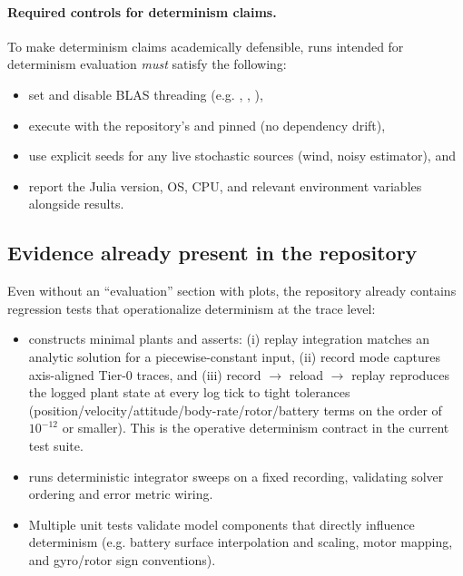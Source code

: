 \paragraph{Required controls for determinism claims.}
To make determinism claims academically defensible, runs intended for determinism evaluation \emph{must} satisfy the following:
\begin{itemize}[leftmargin=*]
  \item set  and disable BLAS threading (e.g. , , ),
  \item execute with the repository's  and  pinned (no dependency drift),
  \item use explicit seeds for any live stochastic sources (wind, noisy estimator), and
  \item report the Julia version, OS, CPU, and relevant environment variables alongside results.
\end{itemize}

\subsection{Evidence already present in the repository}
\label{sec:determinism-evidence}

Even without an ``evaluation'' section with plots, the repository already contains regression tests that operationalize determinism at the trace level:
\begin{itemize}[leftmargin=*]
  \item {} constructs minimal plants and asserts:
    (i) replay integration matches an analytic solution for a piecewise-constant input,
    (ii) record mode captures axis-aligned Tier-0 traces, and
    (iii) record \(\to\) reload \(\to\) replay reproduces the logged plant state at every log tick to tight tolerances (position/velocity/attitude/body-rate/rotor/battery terms on the order of \(10^{-12}\) or smaller). This is the operative determinism contract in the current test suite.
  \item {} runs deterministic integrator sweeps on a fixed recording, validating solver ordering and error metric wiring.
  \item Multiple unit tests validate model components that directly influence determinism (e.g. battery surface interpolation and scaling, motor mapping, and gyro/rotor sign conventions).
\end{itemize}

